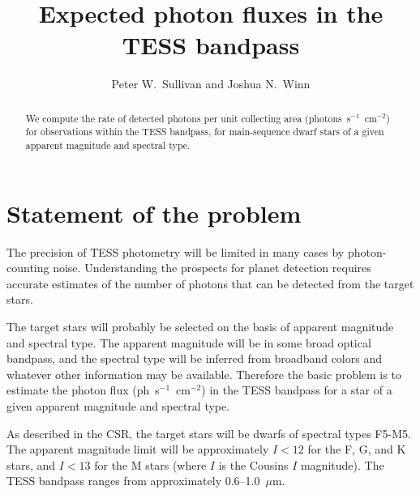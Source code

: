 \documentclass[preprint,10pt]{aastex}
\begin{document}
%
\def\ltsima{$\; \buildrel < \over \sim \;$}
\def\lsim{\lower.5ex\hbox{\ltsima}}
\def\gtsima{$\; \buildrel > \over \sim \;$}
\def\gsim{\lower.5ex\hbox{\gtsima}}

%



\title{ Expected photon fluxes in the TESS bandpass}

\author{Peter W.\ Sullivan and Joshua N.\ Winn}



\begin{abstract}

  We compute the rate of detected photons per unit collecting area
  (photons~s$^{-1}$~cm$^{-2}$) for observations within the TESS bandpass,
  for main-sequence dwarf stars of a given
  apparent magnitude and spectral type.

\end{abstract}

\section{Statement of the problem}

The precision of TESS photometry will be limited in many cases by
photon-counting noise.  Understanding the prospects for planet
detection requires accurate estimates of the number of photons that
can be detected from the target stars.

The target stars will probably be selected on the basis of apparent
magnitude and spectral type.  The apparent magnitude will be in some
broad optical bandpass, and the spectral type will be inferred from
broadband colors and whatever other information may be
available. Therefore the basic problem is to estimate the photon flux
(ph~s$^{-1}$~cm$^{-2}$) in the TESS bandpass for a star of a given
apparent magnitude and spectral type.

As described in the CSR, the target stars will be dwarfs of spectral
types F5-M5. The apparent magnitude limit will be approximately $I<12$
for the F, G, and K stars, and $I<13$ for the M stars (where $I$ is
the Cousins $I$ magnitude). The TESS bandpass ranges from
approximately 0.6--1.0~$\mu$m.
\end{document}
